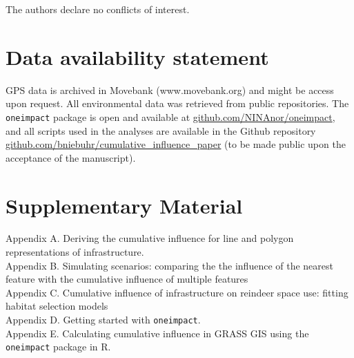 \documentclass[titlepage]{article}
\begin{document}
The authors declare no conflicts of interest.

\section*{Data availability statement}

GPS data is archived in Movebank (www.movebank.org) and might be access upon request. All environmental data was retrieved from public repositories. The \verb|oneimpact| package is open and available at \url{github.com/NINAnor/oneimpact}, and all scripts used in the analyses are available in the Github repository \url{github.com/bniebuhr/cumulative_influence_paper} (to be made public upon the acceptance of the manuscript).

\section*{Supplementary Material}

Appendix A. Deriving the cumulative influence for line and polygon representations of infrastructure. \\
Appendix B. Simulating scenarios: comparing the the influence of the nearest feature with the cumulative influence of multiple features \\
Appendix C. Cumulative influence of infrastructure on reindeer space use: fitting habitat selection models \\
Appendix D. Getting started with \verb|oneimpact|. \\
Appendix E. Calculating cumulative influence in GRASS GIS using the \verb|oneimpact| package in R.



\end{document}
